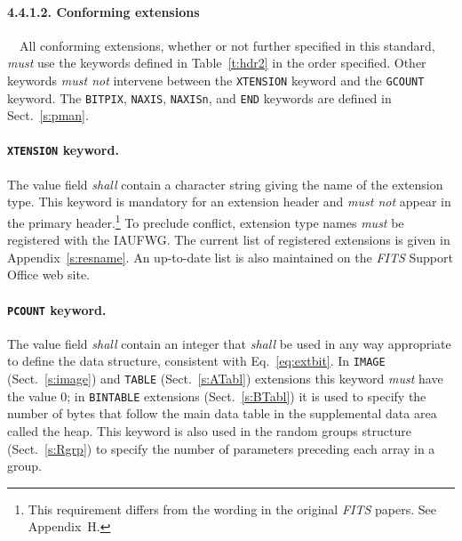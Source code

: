 \documentclass[onecolumn]{aa}
\begin{document}
   \paragraph{4.4.1.2. Conforming extensions}
\label{s:conf}
\ \newline \ \newline   All conforming extensions, whether or not further specified in this standard,
   {\em must} use the
   keywords defined in Table~\ref{t:hdr2} 
   in the order
   specified.  Other keywords {\em must not} intervene between
   the {\tt XTENSION} keyword and the {\tt GCOUNT} keyword.
   The {\tt BITPIX}, {\tt NAXIS}, {\tt NAXISn}, and {\tt END} 
   keywords are defined in Sect.\ \ref{s:pman}.


   \paragraph{{\tt XTENSION} keyword.}
 The value field {\em shall} contain a character string
 giving
 the name of the extension type.  
 This keyword is
 mandatory for an extension header and {\em must not} appear
 in the primary header.\footnote{This requirement 
 differs from the wording in the original 
{\em FITS\/} papers.  See Appendix~H.}
 To preclude conflict, extension type names {\em must} be 
 registered
 with the IAUFWG\@.  The current list of
 registered extensions is given in Appendix~\ref{s:resname}.
 An up-to-date list is also maintained on the {\em FITS\/} 
 Support Office web site.
  
   \paragraph{{\tt PCOUNT} keyword.}
 The value field {\em shall} contain an integer that {\em shall} be
 used in any way appropriate to define the data structure,
 consistent with Eq.~\ref{eq:extbit}.  
 In {\tt IMAGE} (Sect.\ \ref{s:image}) and {\tt TABLE} (Sect.\ \ref{s:ATabl}) extensions
 this keyword {\em must} have the value 0; in {\tt BINTABLE} extensions (Sect.\ \ref{s:BTabl})
 it is used to specify the number of bytes 
 that follow the main data table in the supplemental data area called the heap. 
 This keyword is also used in the random groups structure (Sect.\ \ref{s:Rgrp})
 to specify the number of parameters preceding each array in a group.
 
\end{document}
